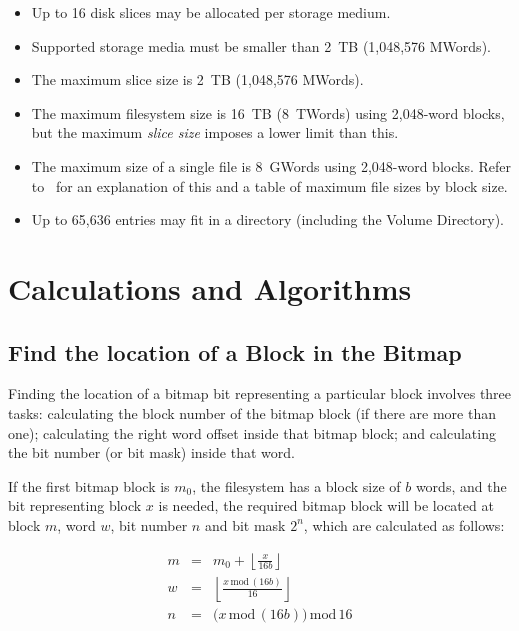 \begin{itemize}
\item Up to 16 \glspl{disk slice} may be allocated per storage medium.
\item Supported storage media must be smaller than 2~TB (1,048,576 MWords).
\item The maximum slice size is 2~TB (1,048,576 MWords).
\item The maximum filesystem size is 16~TB (8~TWords) using 2,048-word
  blocks, but the maximum {\em slice size\/} imposes a lower limit
  than this.
\item The maximum size of a single file is 8~GWords using 2,048-word
  blocks.  Refer to~ for an explanation of
  this and a table of maximum file sizes by block size.
\item Up to 65,636 entries may fit in a directory (including the Volume Directory).
\end{itemize}



\section{Calculations and Algorithms}

\subsection{Find the location of a Block in the Bitmap}

Finding the location of a bitmap bit representing a particular block involves
three tasks: calculating the block number of the bitmap block (if there are
more than one); calculating the right word offset inside that bitmap block; and
calculating the bit number (or bit mask) inside that word.

If the first bitmap block is $m_0$, the filesystem has a block size of
$b$ words, and the bit representing block $x$ is needed, the required bitmap
block will be located at block $m$, word $w$, bit number $n$ and bit mask $2^n$, which are calculated as follows:

\begin{eqnarray}
m & = & m_0 + \left\lfloor \frac{x}{16b} \right\rfloor \nonumber\\
w & = & \left\lfloor \frac{x \,\mbox{mod}\, (16b)}{16}\right\rfloor\nonumber\\
n & = & {\big(x \,\mbox{mod}\, (16b)}\big) \,\mbox{mod}\, 16\nonumber
\end{eqnarray}

